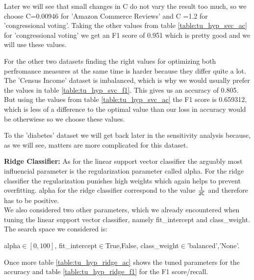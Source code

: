 \documentclass[a4paper,10pt]{article}
\begin{document}
Later we will see that small changes in \textsf{C} do not vary the result too much, so we choose \textsf{C}=0.00946 for 'Amazon Commerce Reviews' and \textsf{C} =1.2 for 'congressional voting'. Taking the other values from table \ref{table:tu_hyp_svc_ac} for 'congressional voting' we get an F1 score of 0.951 which is pretty good and we will use these values.

For the other two datasets finding the right values for optimizing both perfromance measures at the same time is harder because they differ quite a lot. The 'Census Income' dataset is imbalanced, which is why we would usually prefer the values in table \ref{table:tu_hyp_svc_f1}. This gives us an accuracy of 0.805. But using the values from table \ref{table:tu_hyp_svc_ac} the F1 score is 0.659312, which is less of a difference to the optimal value than our loss in accuracy would be otherwiese so we choose these values.

To the 'diabetes' dataset we will get back later in the sensitivity analysis because, as we will see, matters are more complicated for this dataset.

\textbf{Ridge Classifier:}
As for the linear support vector classifier the arguably most influencial parameter is the regularization parameter called \textsf{alpha}. For the ridge classifier the regularization punishes high weights which again helps to prevent overfitting. \textsf{alpha} for the ridge classifier correspond to the value \(\frac{1}{2 \text{\textsf{C}}}\) and therefore has to be positive.\\
We also considered two other parameters, which we already encountered when tuning the linear support vector classifier, namely \textsf{fit\_intercept} and \textsf{class\_weight}. The search space we considered is:
\begin{center}
    \textsf{alpha}\(\in[0,100]\), \textsf{fit\_intercept}\(\in\){True,False}, \textsf{class\_weight}\(\in\){'balanced','None'}.
\end{center}

Once more table \ref{table:tu_hyp_ridge_ac} shows the tuned parameters for the accuracy and table \ref{table:tu_hyp_ridge_f1} for the F1 score/recall.
\end{document}

